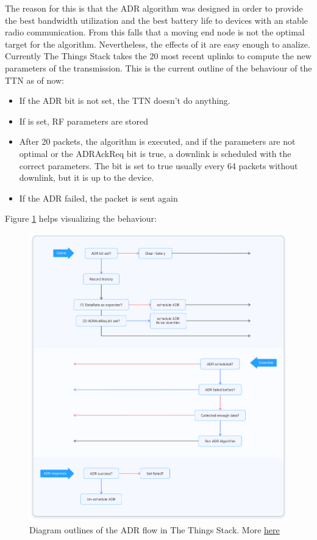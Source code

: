 The reason for this is that the ADR algorithm was designed in order
to provide the best bandwidth utilization and the best battery life
to devices with an stable radio communication. From this falls that 
a moving end node is not the optimal target for the algorithm. Nevertheless, 
the effects of it are easy enough to analize. 
Currently The Things Stack takes the 20 most recent uplinks 
to compute the new parameters of the transmission.
This is the current outline of the behaviour of the TTN as of now:
\begin{itemize}
    \item If the ADR bit is not set, the TTN doesn't do anything.
    \item If is set, RF parameters are stored
    \item After 20 packets, the algorithm is executed, and if the 
    parameters are not optimal or the ADRAckReq bit is true, a downlink is 
    scheduled with the correct parameters. The bit is set to true usually
    every 64 packets without downlink, but it is up to the device.
    \item If the ADR failed, the packet is sent again
\end{itemize}
Figure \ref{chap1:adr} helps  visualizing the behaviour:\\
\begin{figure}[htbp]
    \centering
    \includegraphics[width = \linewidth]{adr.png}
    \caption{Diagram outlines of the ADR flow in The Things Stack. More \href{https://www.thethingsnetwork.org/docs/lorawan/adaptive-data-rate/}{here}}
    \label{chap1:adr}
\end{figure}
